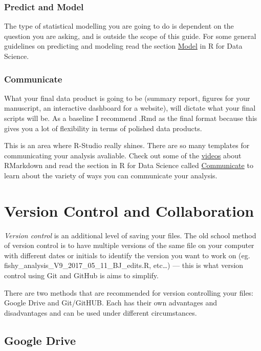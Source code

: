 \documentclass[]{book}
\begin{document}
\subsection{Predict and Model}\label{predict-and-model}

The type of statistical modelling you are going to do is dependent on
the question you are asking, and is outside the scope of this guide. For
some general guidelines on predicting and modeling read the section
\href{http://r4ds.had.co.nz/model-intro.html}{Model} in R for Data
Science.

\subsection{Communicate}\label{communicate}

What your final data product is going to be (summary report, figures for
your manuscript, an interactive dashboard for a website), will dictate
what your final scripts will be. As a baseline I recommend .Rmd as the
final format because this gives you a lot of flexibility in terms of
polished data products.

This is an area where R-Studio really shines. There are so many
templates for communicating your analysis avaliable. Check out some of
the \href{http://rmarkdown.rstudio.com/lesson-1.html}{videos} about
RMarkdown and read the section in R for Data Science called
\href{http://r4ds.had.co.nz/communicate-intro.html}{Communicate} to
learn about the variety of ways you can communicate your analysis.

\chapter{Version Control and
Collaboration}\label{version-control-and-collaboration}

\emph{Version control} is an additional level of saving your files. The
old school method of version control is to have multiple versions of the
same file on your computer with different dates or initials to identify
the version you want to work on (eg.
fishy\_analysis\_V9\_2017\_05\_11\_BJ\_edits.R, etc\ldots{}) --- this is
what version control using Git and GitHub is aims to simplify.

There are two methods that are recommended for version controlling your
files: Google Drive and Git/GitHUB. Each has their own advantages and
disadvantages and can be used under different circumstances.

\section{Google Drive}\label{google-drive}
\end{document}
